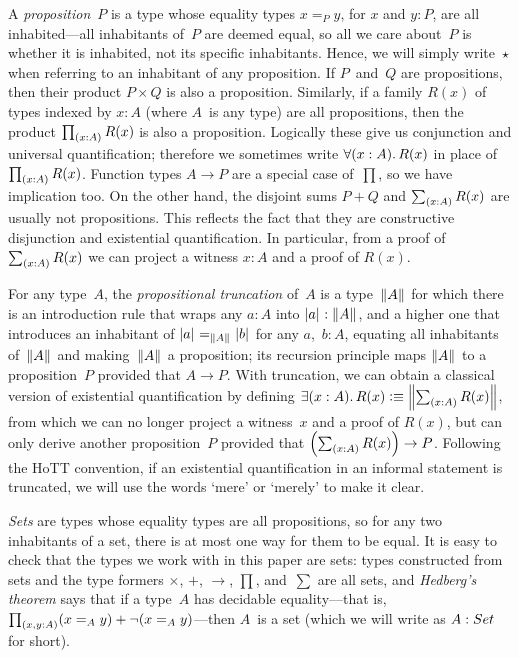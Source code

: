 \documentclass[draft,a4paper,UKenglish,numberwithinsect,cleveref,thm-restate]{lipics-v2021}
\numberwithin{equation}{section}
\theoremstyle{definition}
\theoremstyle{plain}
\begin{document}
A \emph{proposition}~$P$ is a type whose equality types $x =_P y$, for $x$ and $y : P$, are all inhabited---all inhabitants of~$P$ are deemed equal, so all we care about~$P$ is whether it is inhabited, not its specific inhabitants.
Hence, we will simply write~$\star$ when referring to an inhabitant of any proposition.
If $P$~and~$Q$ are propositions, then their product $P \times Q$ is also a proposition.
Similarly, if a family $R(x)$ of types indexed by $x : A$ (where $A$~is any type) are all propositions, then the product $\prd{x : A} R(x)$ is also a proposition.
Logically these give us conjunction and universal quantification; therefore we sometimes write $\fall{x : A} R(x)$ in place of $\prd{x : A} R(x)$.
Function types $A \to P$ are a special case of~$\prod$, so we have implication too.
On the other hand, the disjoint sums $P + Q$ and $\sm{x : A} R(x)$ are usually not propositions.
This reflects the fact that they are constructive disjunction and existential quantification.
In particular, from a proof of $\sm{x : A} R(x)$ we can project a witness $x : A$ and a proof of $R(x)$.

For any type~$A$, the \emph{propositional truncation} of~$A$ is a type~$\mathopen{}\left\Vert A\right\Vert_{}\mathclose{}$ for which there is an introduction rule that wraps any $a : A$ into $\mathopen{}\left|a\right|_{}^{}\mathclose{} : \mathopen{}\left\Vert A\right\Vert_{}\mathclose{}$, and a higher one that introduces an inhabitant of $\mathopen{}\left|a\right|_{}^{}\mathclose{} =_{\mathopen{}\left\Vert A\right\Vert_{}\mathclose{}} \mathopen{}\left|b\right|_{}^{}\mathclose{}$ for any $a$,~$b : A$, equating all inhabitants of~$\mathopen{}\left\Vert A\right\Vert_{}\mathclose{}$ and making~$\mathopen{}\left\Vert A\right\Vert_{}\mathclose{}$ a proposition; its recursion principle maps $\mathopen{}\left\Vert A\right\Vert_{}\mathclose{}$ to a proposition~$P$ provided that $A \to P$.
With truncation, we can obtain a classical version of existential quantification by defining $\exis{x : A} R(x) \defeq \brck{\sm{x : A} R(x)}$, from which we can no longer project a witness~$x$ and a proof of $R(x)$, but can only derive another proposition~$P$ provided that $\left(\sm{x : A} R(x)\right) \to P$.
Following the HoTT convention, if an existential quantification in an informal statement is truncated, we will use the words `mere' or `merely' to make it clear.

\emph{Sets} are types whose equality types are all propositions, so for any two inhabitants of a set, there is at most one way for them to be equal.
It is easy to check that the types we work with in this paper are sets: types constructed from sets and the type formers $\times$, $+$, $\to$, $\prod$, and~$\sum$ are all sets, and \emph{Hedberg's theorem} says that if a type~$A$ has decidable equality---that is, $\prd{x, y : A} (x =_A y) + \neg(x =_A y)$---then $A$~is a set (which we will write as $A : \set$ for short).
\end{document}
